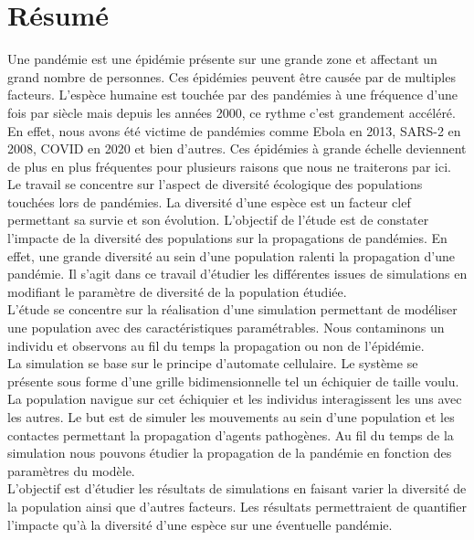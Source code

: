 \chapter{Résumé} \label{ch:resume}

Une pandémie est une épidémie présente sur une grande zone et affectant un grand nombre de personnes. Ces épidémies peuvent être causée par de multiples facteurs. L'espèce humaine est touchée par des pandémies à une fréquence d'une fois par siècle mais depuis les années 2000, ce rythme c'est grandement accéléré. En effet, nous avons été victime de pandémies comme Ebola en 2013, SARS-2 en 2008, COVID en 2020 et bien d'autres. Ces épidémies à grande échelle deviennent de plus en plus fréquentes pour plusieurs raisons que nous ne traiterons par ici.\\

Le travail se concentre sur l'aspect de diversité écologique des populations touchées lors de pandémies. La diversité d'une espèce est un facteur clef permettant sa survie et son évolution. L'objectif de l'étude est de constater l'impacte de la diversité des populations sur la propagations de pandémies. En effet, une grande diversité au sein d'une population ralenti la propagation d'une pandémie. Il s'agit dans ce travail d'étudier les différentes issues de simulations en modifiant le paramètre de diversité de la population étudiée.\\

L'étude se concentre sur la réalisation d'une simulation permettant de modéliser une population avec des caractéristiques paramétrables. Nous contaminons un individu et observons au fil du temps la propagation ou non de l'épidémie.\\

La simulation se base sur le principe d'automate cellulaire. Le système se présente sous forme d'une grille bidimensionnelle tel un échiquier de taille voulu. La population navigue sur cet échiquier et les individus interagissent les uns avec les autres. Le but est de simuler les mouvements au sein d'une population et les contactes permettant la propagation d'agents pathogènes. Au fil du temps de la simulation nous pouvons étudier la propagation de la pandémie en fonction des paramètres du modèle.\\

L'objectif est d'étudier les résultats de simulations en faisant varier la diversité de la population ainsi que d'autres facteurs. Les résultats permettraient de quantifier l'impacte qu'à la diversité d'une espèce sur une éventuelle pandémie.
